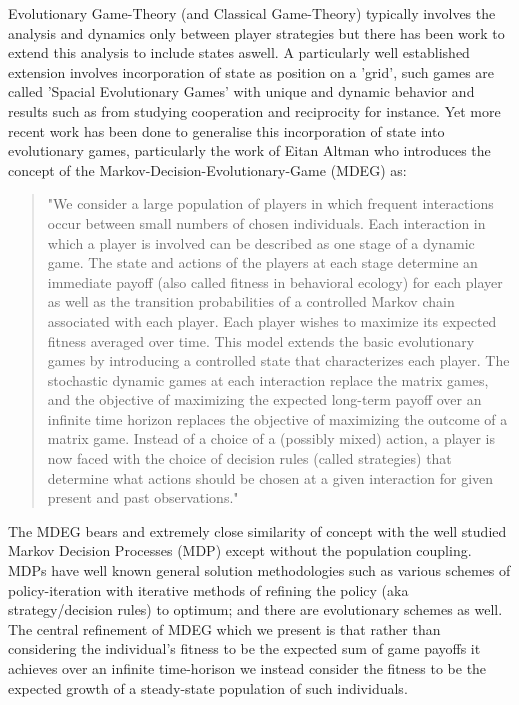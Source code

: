 \documentclass[journal,article,accept,oneauthors,pdftex,10pt,a4paper]{mdpi}
\begin{document}
Evolutionary Game-Theory (and Classical Game-Theory) typically involves the analysis and dynamics only between player strategies but there has been work to extend this analysis to include states aswell. A particularly well established extension involves incorporation of state as position on a 'grid', such games are called 'Spacial Evolutionary Games'\cite{spacial1} with unique and dynamic behavior\cite{spacial2} and results such as from studying cooperation and reciprocity\cite{spacial3} for instance.
Yet more recent work has been done to generalise this incorporation of state into evolutionary games, particularly the work of Eitan Altman\cite{markov2}\cite{markov3}\cite{markov4}\cite{markov5} who introduces the concept of the Markov-Decision-Evolutionary-Game (MDEG) as:
\begin{quote}
"We consider a large population of players in which frequent interactions occur between small numbers of chosen individuals. Each interaction in which a player is involved can be described as one stage of a dynamic game. The state and actions of the players at each stage determine an immediate payoff (also called fitness in behavioral ecology) for each player as well as the transition probabilities of a controlled Markov chain associated with each player. Each player wishes to maximize its expected fitness averaged over time.
This model extends the basic evolutionary games by introducing a controlled state that characterizes each player.
The stochastic dynamic games at each interaction replace the matrix games, and the objective of maximizing the expected long-term payoff over an infinite time horizon replaces the objective of maximizing the outcome of a matrix game. Instead of a choice of a (possibly mixed) action, a player is now faced with the choice of decision rules (called strategies) that determine what actions should be chosen at a given interaction for given present and past observations."\cite{markov3}
\end{quote}
The MDEG bears and extremely close similarity of concept with the well studied Markov Decision Processes (MDP) except without the population coupling. MDPs have well known general solution methodologies such as various schemes of policy-iteration with iterative methods of refining the policy (aka strategy/decision rules) to optimum; and there are evolutionary schemes as well.\cite{markov6}
The central refinement of MDEG which we present is that rather than considering the individual's fitness to be the expected sum of game payoffs it achieves over an infinite time-horison we instead consider the fitness to be the expected growth of a steady-state population of such individuals.
\end{document}
